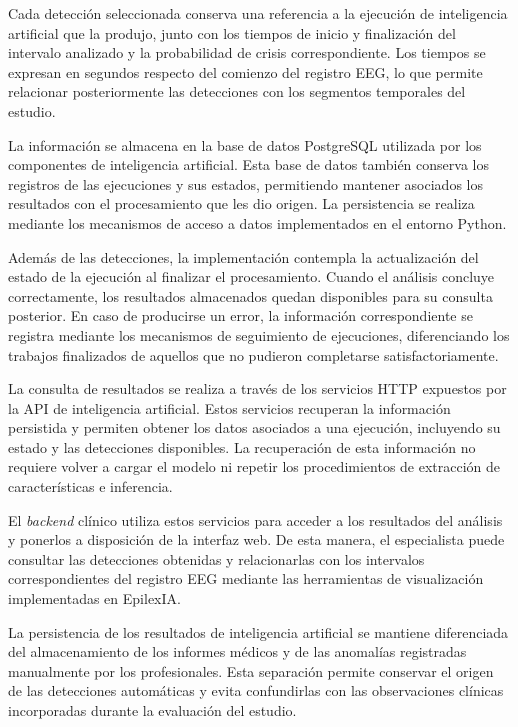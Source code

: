 Cada detección seleccionada conserva una referencia a la
ejecución de inteligencia artificial que la produjo, junto
con los tiempos de inicio y finalización del intervalo
analizado y la probabilidad de crisis correspondiente.
Los tiempos se expresan en segundos respecto del comienzo
del registro EEG, lo que permite relacionar posteriormente
las detecciones con los segmentos temporales del estudio.

La información se almacena en la base de datos PostgreSQL
utilizada por los componentes de inteligencia artificial.
Esta base de datos también conserva los registros de las
ejecuciones y sus estados, permitiendo mantener asociados
los resultados con el procesamiento que les dio origen.
La persistencia se realiza mediante los mecanismos de
acceso a datos implementados en el entorno Python.

Además de las detecciones, la implementación contempla
la actualización del estado de la ejecución al finalizar
el procesamiento. Cuando el análisis concluye correctamente,
los resultados almacenados quedan disponibles para su
consulta posterior. En caso de producirse un error, la
información correspondiente se registra mediante los
mecanismos de seguimiento de ejecuciones, diferenciando
los trabajos finalizados de aquellos que no pudieron
completarse satisfactoriamente.

La consulta de resultados se realiza a través de los
servicios HTTP expuestos por la API de inteligencia
artificial. Estos servicios recuperan la información
persistida y permiten obtener los datos asociados a una
ejecución, incluyendo su estado y las detecciones
disponibles. La recuperación de esta información no
requiere volver a cargar el modelo ni repetir los
procedimientos de extracción de características e
inferencia.

El \textit{backend} clínico utiliza estos servicios para acceder
a los resultados del análisis y ponerlos a disposición
de la interfaz web. De esta manera, el especialista
puede consultar las detecciones obtenidas y relacionarlas
con los intervalos correspondientes del registro EEG
mediante las herramientas de visualización implementadas
en EpilexIA.

La persistencia de los resultados de inteligencia
artificial se mantiene diferenciada del almacenamiento
de los informes médicos y de las anomalías registradas
manualmente por los profesionales. Esta separación
permite conservar el origen de las detecciones automáticas
y evita confundirlas con las observaciones clínicas
incorporadas durante la evaluación del estudio.

